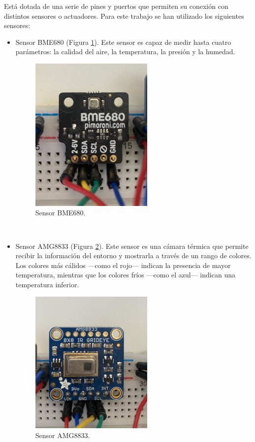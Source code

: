 Está dotada de una serie de pines y puertos que permiten su conexión con distintos sensores o actuadores. Para este trabajo se han utilizado los siguientes sensores:
\begin{itemize}
\item{Sensor BME680 (Figura \ref{fig:bme}).} Este sensor es capaz de medir hasta cuatro parámetros: la calidad del aire, la temperatura, la presión y la humedad.
\begin{figure} [h!]
  \begin{center}
    \includegraphics[width=6cm]{figs/bme}
  \end{center}
  \caption{Sensor BME680.}
  \label{fig:bme}
\end{figure}\\

\item{Sensor AMG8833 (Figura \ref{fig:amg}).} Este sensor es una cámara térmica que permite recibir la información del entorno y mostrarla a través de un rango de colores. Los colores más cálidos ---como el rojo--- indican la presencia de mayor temperatura, mientras que los colores fríos ---como el azul--- indican una temperatura inferior.
\begin{figure} [h!]
  \begin{center}
    \includegraphics[width=6cm]{figs/amg}
  \end{center}
  \caption{Sensor AMG8833.}
  \label{fig:amg}
\end{figure}\\


\end{itemize}
